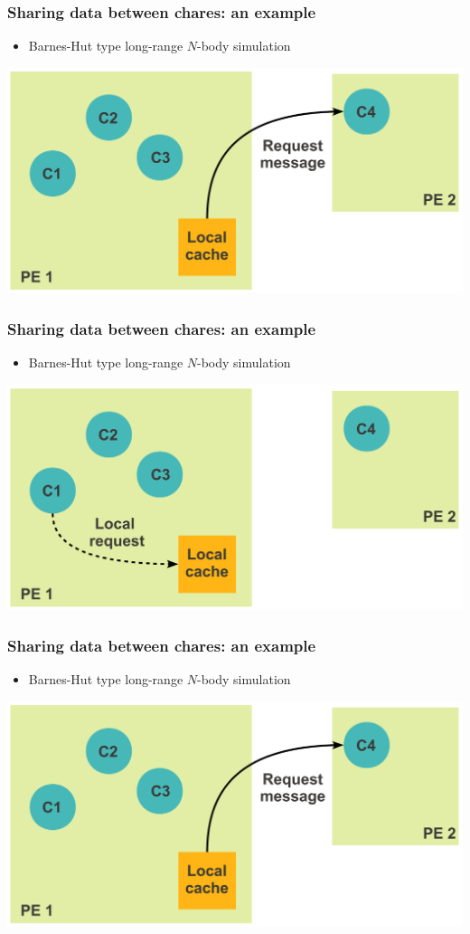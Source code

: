 \begin{frame}[fragile]
  \frametitle{Sharing data between chares: an example}
  \begin{itemize}
    \item Barnes-Hut type long-range $N$-body simulation
  \end{itemize}
  \includegraphics[width=\textwidth]{figures/advancedOpts/fig5}
\end{frame}

\begin{frame}[fragile]
  \frametitle{Sharing data between chares: an example}
  \begin{itemize}
    \item Barnes-Hut type long-range $N$-body simulation
  \end{itemize}
  \includegraphics[width=\textwidth]{figures/advancedOpts/fig4}
\end{frame}

\begin{frame}[fragile]
  \frametitle{Sharing data between chares: an example}
  \begin{itemize}
    \item Barnes-Hut type long-range $N$-body simulation
  \end{itemize}
  \includegraphics[width=\textwidth]{figures/advancedOpts/fig5}
\end{frame}

